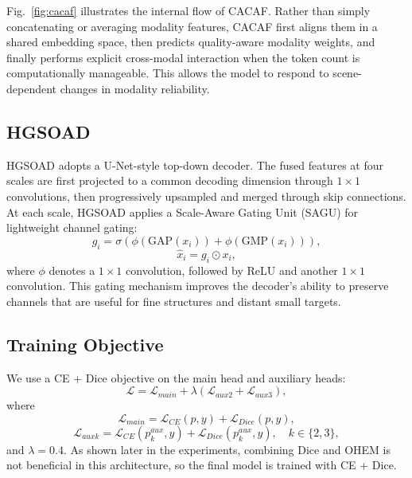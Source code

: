 Fig.~\ref{fig:cacaf} illustrates the internal flow of CACAF. Rather than simply concatenating or averaging modality features, CACAF first aligns them in a shared embedding space, then predicts quality-aware modality weights, and finally performs explicit cross-modal interaction when the token count is computationally manageable. This allows the model to respond to scene-dependent changes in modality reliability.

\subsection{HGSOAD}

HGSOAD adopts a U-Net-style top-down decoder. The fused features at four scales are first projected to a common decoding dimension through $1\times1$ convolutions, then progressively upsampled and merged through skip connections. At each scale, HGSOAD applies a Scale-Aware Gating Unit (SAGU) for lightweight channel gating:
\begin{equation}
g_i=\sigma\left(\phi(\mathrm{GAP}(x_i))+\phi(\mathrm{GMP}(x_i))\right),
\end{equation}
\begin{equation}
\hat{x}_i = g_i \odot x_i,
\end{equation}
where $\phi$ denotes a $1\times1$ convolution, followed by ReLU and another $1\times1$ convolution. This gating mechanism improves the decoder's ability to preserve channels that are useful for fine structures and distant small targets.

\subsection{Training Objective}

We use a CE + Dice objective on the main head and auxiliary heads:
\begin{equation}
\mathcal{L}=\mathcal{L}_{main} + \lambda \left(\mathcal{L}_{aux2}+\mathcal{L}_{aux3}\right),
\end{equation}
where
\begin{equation}
\mathcal{L}_{main}=\mathcal{L}_{CE}(p,y)+\mathcal{L}_{Dice}(p,y),
\end{equation}
\begin{equation}
\mathcal{L}_{auxk}=\mathcal{L}_{CE}(p_k^{aux},y)+\mathcal{L}_{Dice}(p_k^{aux},y), \quad k\in\{2,3\},
\end{equation}
and $\lambda=0.4$. As shown later in the experiments, combining Dice and OHEM is not beneficial in this architecture, so the final model is trained with CE + Dice.
